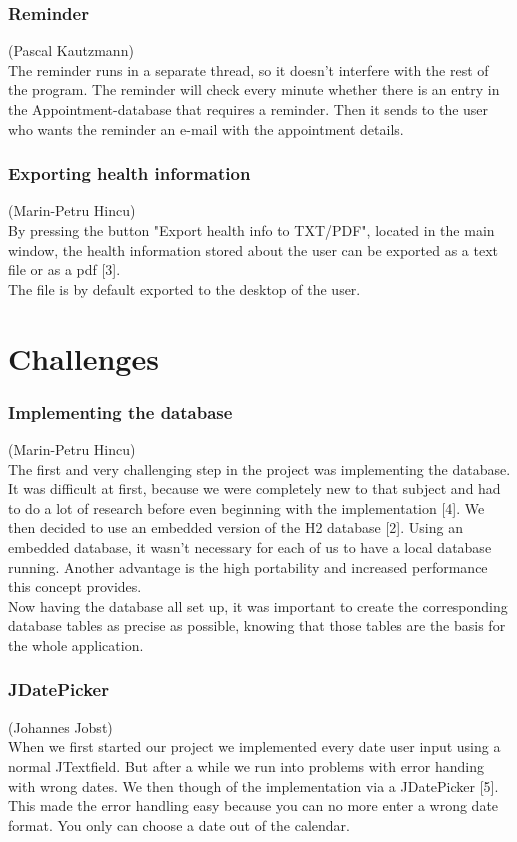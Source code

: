 \documentclass[a4paper, 12pt]{report}
\begin{document}
\subsection{Reminder}
{\tiny (Pascal Kautzmann)\\}
The reminder runs in a separate thread, so it doesn't interfere with the rest of the program.
The reminder will check every minute whether there is an entry in the Appointment-database that requires a reminder. 
Then it sends to the user who wants the reminder an e-mail with the appointment details.

\subsection{Exporting health information}
{\tiny (Marin-Petru Hincu)\\}
By pressing the button "Export health info to TXT/PDF", located in the main window, the health information stored about the user can be exported as a text file or as a pdf [3].\\ The file is by default exported to the desktop of the user.

\chapter{Challenges}
\subsection{Implementing the database}
{\tiny (Marin-Petru Hincu)\\}
The first and very challenging step in the project was implementing the database. It was difficult at first, because we were completely new to that subject and had to do a lot of research before even beginning with the implementation [4]. We then decided to use an embedded version of the H2 database [2].
Using an embedded database, it wasn't necessary for each of us to have a local database running. Another advantage is the high portability and increased performance this concept provides.\\
Now having the database all set up, it was important to create the corresponding database tables as precise as possible, knowing that those tables are the basis for the whole application. \\

\subsection{JDatePicker}
{\tiny (Johannes Jobst)\\}
When we first started our project we implemented every date user input using a normal JTextfield. But after a while we run into problems with error handing with wrong dates. We then though of the implementation via a JDatePicker [5]. This made the error handling easy because you can no more enter a wrong date format. You only can choose a date out of the calendar. 
\end{document}
